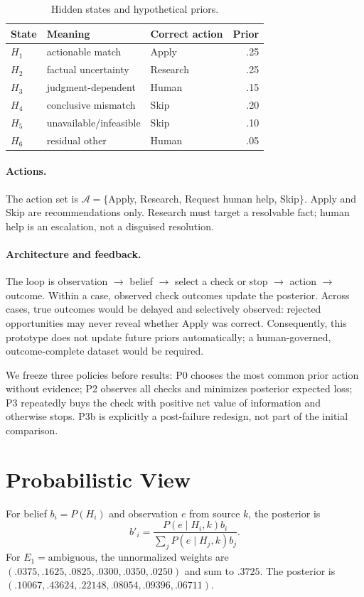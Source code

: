 \documentclass{article}
\begin{document}
\begin{table}[t]
\centering\small
\caption{Hidden states and hypothetical priors.}
\label{tab:states}
\begin{tabular}{lllr}
\toprule
State & Meaning & Correct action & Prior\\
\midrule
$H_1$ & actionable match & Apply & .25\\
$H_2$ & factual uncertainty & Research & .25\\
$H_3$ & judgment-dependent & Human & .15\\
$H_4$ & conclusive mismatch & Skip & .20\\
$H_5$ & unavailable/infeasible & Skip & .10\\
$H_6$ & residual other & Human & .05\\
\bottomrule
\end{tabular}
\end{table}

\paragraph{Actions.} The action set is $\mathcal A=\{$Apply, Research, Request human help, Skip$\}$. Apply and Skip are recommendations only. Research must target a resolvable fact; human help is an escalation, not a disguised resolution.

\paragraph{Architecture and feedback.} The loop is observation $\rightarrow$ belief $\rightarrow$ select a check or stop $\rightarrow$ action $\rightarrow$ outcome. Within a case, observed check outcomes update the posterior. Across cases, true outcomes would be delayed and selectively observed: rejected opportunities may never reveal whether Apply was correct. Consequently, this prototype does not update future priors automatically; a human-governed, outcome-complete dataset would be required.

We freeze three policies before results: P0 chooses the most common prior action without evidence; P2 observes all checks and minimizes posterior expected loss; P3 repeatedly buys the check with positive net value of information and otherwise stops. P3b is explicitly a post-failure redesign, not part of the initial comparison.

\section{Probabilistic View}
For belief $b_i=P(H_i)$ and observation $e$ from source $k$, the posterior is
\begin{equation}
b'_i=\frac{P(e\mid H_i,k)b_i}{\sum_jP(e\mid H_j,k)b_j}.
\end{equation}
For $E_1=\mathrm{ambiguous}$, the unnormalized weights are $(.0375,.1625,.0825,.0300,.0350,.0250)$ and sum to $.3725$. The posterior is $(.10067,.43624,.22148,.08054,.09396,.06711)$.
\end{document}
